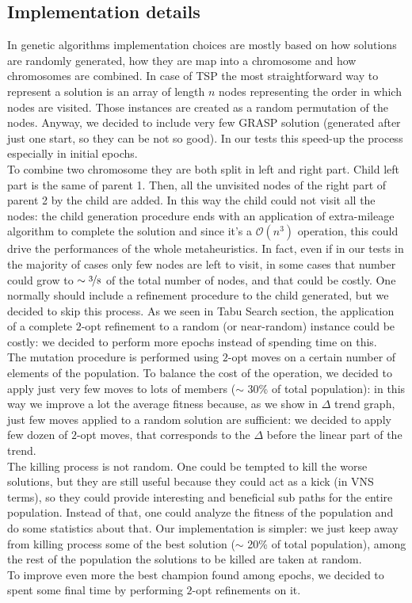 \subsection{Implementation details}
In genetic algorithms implementation choices are mostly based on how solutions
are randomly generated, how they are map into a chromosome and how chromosomes
are combined. In case of TSP the most straightforward way to represent a
solution is an array of length $n$ nodes representing the order in which nodes
are visited. Those instances are created as a random permutation of the nodes.
Anyway, we decided to include very few GRASP solution (generated after just one
start, so they can be not so good). In our tests this speed-up the process
especially in initial epochs.\\
To combine two chromosome they are both split in left and right part. Child left
part is the same of parent 1. Then, all the unvisited nodes of the right part of
parent 2 by the child are added. In this way the child could not visit all the
nodes: the child generation procedure ends with an application of extra-mileage
algorithm to complete the solution and since it's a $\mathcal{O}(n^3)$
operation, this could drive the performances of the whole metaheuristics. In
fact, even if in our tests in the majority of cases only few nodes are left to
visit, in some cases that number could grow to $\sim\nicefrac{3}{8}$ of the total
number of nodes, and that could be costly. One normally should include a
refinement procedure to the child generated, but we decided to skip this
process. As we seen in Tabu Search section, the application of a complete
$2$-opt refinement to a random (or near-random) instance could be costly: we
decided to perform more epochs instead of spending time on this.\\
The mutation procedure is performed using $2$-opt moves on a certain number of
elements of the population. To balance the cost of the operation, we decided to
apply just very few moves to lots of members ($\sim$ 30\% of total population):
in this way we improve a lot the average fitness because, as we show in $\Delta$
trend graph, just few moves applied to a random solution are sufficient: we
decided to apply few dozen of $2$-opt moves, that corresponds to the $\Delta$
before the linear part of the trend.\\
The killing process is not random. One could be tempted to kill the worse
solutions, but they are still useful because they could act as a kick (in VNS
terms), so they could provide interesting and beneficial sub paths for the entire
population. Instead of that, one could analyze the fitness of the population and
do some statistics about that. Our implementation is simpler: we just keep away
from killing process some of the best solution ($\sim$ 20\% of total
population), among the rest of the population
the solutions to be killed are taken at random.\\
To improve even more the best champion found among epochs, we decided to spent some final
time by performing $2$-opt refinements on it.

